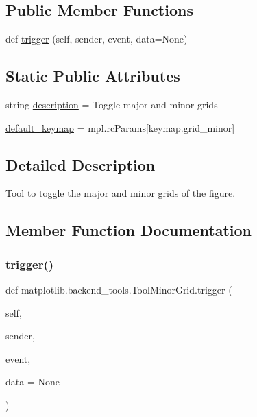\subsection*{Public Member Functions}
\begin{DoxyCompactItemize}
\item 
def \hyperlink{classmatplotlib_1_1backend__tools_1_1ToolMinorGrid_a4ca98ad5fce7baa868700fe79d34364f}{trigger} (self, sender, event, data=None)
\end{DoxyCompactItemize}
\subsection*{Static Public Attributes}
\begin{DoxyCompactItemize}
\item 
string \hyperlink{classmatplotlib_1_1backend__tools_1_1ToolMinorGrid_ad974a4cc756f35e35d4256cf2ee51984}{description} = \textquotesingle{}Toggle major and minor grids\textquotesingle{}
\item 
\hyperlink{classmatplotlib_1_1backend__tools_1_1ToolMinorGrid_aa55c0b170b27c75d6fae7a091e614c04}{default\+\_\+keymap} = mpl.\+rc\+Params\mbox{[}\textquotesingle{}keymap.\+grid\+\_\+minor\textquotesingle{}\mbox{]}
\end{DoxyCompactItemize}


\subsection{Detailed Description}
\begin{DoxyVerb}Tool to toggle the major and minor grids of the figure.\end{DoxyVerb}
 

\subsection{Member Function Documentation}
\mbox{\label{classmatplotlib_1_1backend__tools_1_1ToolMinorGrid_a4ca98ad5fce7baa868700fe79d34364f}} 
\subsubsection{\texorpdfstring{trigger()}{trigger()}}
{\footnotesize\ttfamily def matplotlib.\+backend\+\_\+tools.\+Tool\+Minor\+Grid.\+trigger (\begin{DoxyParamCaption}\item[{}]{self,  }\item[{}]{sender,  }\item[{}]{event,  }\item[{}]{data = {\ttfamily None} }\end{DoxyParamCaption})}



